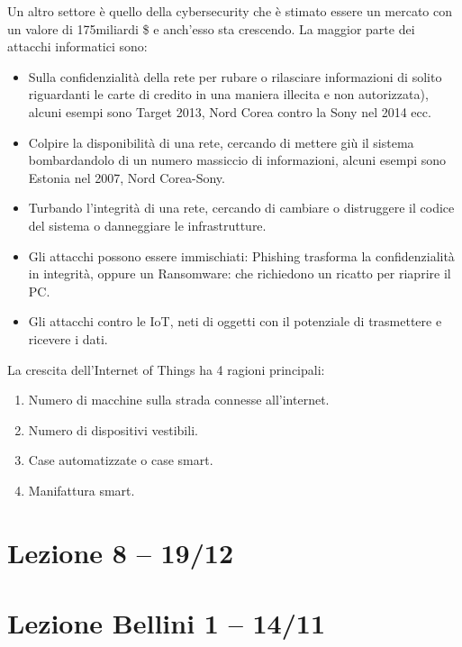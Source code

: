 \documentclass[a4page, 11pt]{article}
\begin{document}
Un altro settore è quello della cybersecurity che è stimato essere un
mercato con un valore di 175miliardi \$ e anch'esso sta crescendo. La
maggior parte dei attacchi informatici sono:

\begin{itemize}
	 
	\item
	Sulla confidenzialità della rete per rubare o rilasciare informazioni
	di solito riguardanti le carte di credito in una maniera illecita e
	non autorizzata), alcuni esempi sono Target 2013, Nord Corea contro la
	Sony nel 2014 ecc.
	\item
	Colpire la disponibilità di una rete, cercando di mettere giù il
	sistema bombardandolo di un numero massiccio di informazioni, alcuni
	esempi sono Estonia nel 2007, Nord Corea-Sony.
	\item
	Turbando l'integrità di una rete, cercando di cambiare o distruggere
	il codice del sistema o danneggiare le infrastrutture.
	\item
	Gli attacchi possono essere immischiati: Phishing trasforma la
	confidenzialità in integrità, oppure un Ransomware: che richiedono un
	ricatto per riaprire il PC.
	\item
	Gli attacchi contro le IoT, neti di oggetti con il potenziale di
	trasmettere e ricevere i dati.
\end{itemize}

La crescita dell'Internet of Things ha 4 ragioni principali:

\begin{enumerate}
	\def\labelenumi{\arabic{enumi}.}
	 
	\item
	Numero di macchine sulla strada connesse all'internet.
	\item
	Numero di dispositivi vestibili.
	\item
	Case automatizzate o case smart.
	\item
	Manifattura smart.
\end{enumerate}
\section*{Lezione 8 -- 19/12}
\section*{Lezione Bellini 1 -- 14/11}
\end{document}
